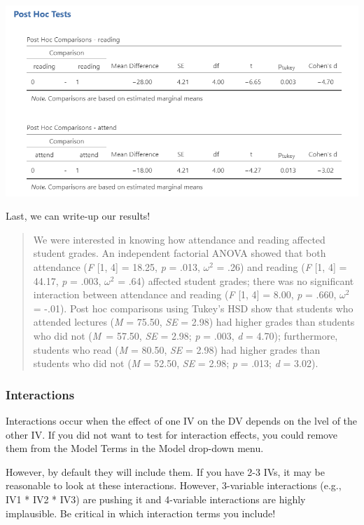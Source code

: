 \documentclass[
]{book}
\begin{document}
\includegraphics{images/06-factorial-anova/independent-factorial_posthoc.png}

Last, we can write-up our results!

\begin{quote}
We were interested in knowing how attendance and reading affected student grades. An independent factorial ANOVA showed that both attendance (\emph{F} {[}1, 4{]} = 18.25, \emph{p} = .013, \(\omega^2\) = .26) and reading (\emph{F} {[}1, 4{]} = 44.17, \emph{p} = .003, \(\omega^2\) = .64) affected student grades; there was no significant interaction between attendance and reading (\emph{F} {[}1, 4{]} = 8.00, \emph{p} = .660, \(\omega^2\) = -.01). Post hoc comparisons using Tukey's HSD show that students who attended lectures (\emph{M} = 75.50, \emph{SE} = 2.98) had higher grades than students who did not (\emph{M}~= 57.50, \emph{SE} = 2.98; \emph{p} = .003, \emph{d} = 4.70); furthermore, students who read (\emph{M} = 80.50, \emph{SE} = 2.98) had higher grades than students who did not (\emph{M} = 52.50, \emph{SE} = 2.98; \emph{p} = .013; \emph{d} = 3.02).
\end{quote}

\hypertarget{interactions}{%
\subsubsection{Interactions}\label{interactions}}

Interactions occur when the effect of one IV on the DV depends on the lvel of the other IV. If you did not want to test for interaction effects, you could remove them from the Model Terms in the Model drop-down menu.

However, by default they will include them. If you have 2-3 IVs, it may be reasonable to look at these interactions. However, 3-variable interactions (e.g., IV1 * IV2 * IV3) are pushing it and 4-variable interactions are highly implausible. Be critical in which interaction terms you include!
\end{document}
